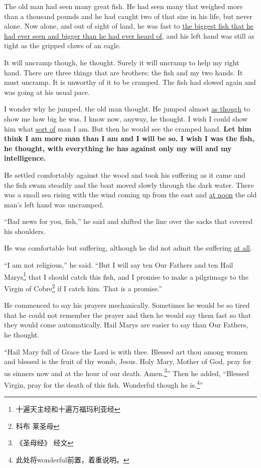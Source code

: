The old man had seen many great fish. He had seen many that weighed more
than a thousand pounds and he had caught two of that size in his life, but
never alone. Now alone, and out of sight of land, he was fast to \uline{the
  biggest fish that he had ever seen and bigger than he had ever heard of},
and his left hand was still as tight as the gripped claws of an eagle.

It will uncramp though, he thought. Surely it will uncramp to help my right
hand. There are three things that are brothers: the fish and my two hands.
It must uncramp. It is \gls{unworthy} of it to be cramped. The fish had slowed
again and was going at his \gls{usual} \gls{pace}.

I wonder why he jumped, the old man thought. He jumped almost \uline{as
  though} to show me how big he was. I know now, anyway, he thought. I wish
I could show him what \uline{sort of} man I am. But then he would see the
cramped hand. \textbf{Let him think I am more man than I am and I will be
  so. I wish I was the fish, he thought, with everything he has against only
  my will and my intelligence.}

He settled comfortably against the wood and took his \gls{suffering} as it
came and the fish swam steadily and the boat moved slowly through the dark
water. There was a small sea rising with the wind coming up from the east
and \uline{at noon} the old man's left hand was uncramped.

``Bad news for you, fish,'' he said and shifted the line over the sacks that
covered his shoulders.

He was comfortable but suffering, although he did not \gls{admit} the
suffering \uline{at all}.

``I am not \gls{religious},'' he said. ``But I will say ten Our Fathers and
ten Hail Marys\footnote{十遍天主经和十遍万福玛利亚经} that I should catch this fish,
and I promise to make a \gls{pilgrimage} to the Virgin of Cobre\footnote{科布
  莱圣母} if I catch him. That is a promise.''

He commenced to say his \glspl{prayer} \gls{mechanically}. Sometimes he
would be so tired that he could not remember the prayer and then he would
say them fast so that they would come automatically. Hail Marys are easier
to say than Our Fathers, he thought.

``Hail Mary full of Grace the Lord is with thee. Blessed art thou among
women and blessed is the fruit of thy womb, Jesus. Holy Mary, Mother of God,
pray for us sinners now and at the hour of our death. Amen.\footnote{《圣母经》
  经文}'' Then he added, ``Blessed Virgin, pray for the death of this fish.
Wonderful though he is.\footnote{此处将wonderful前置，着重说明。}''

